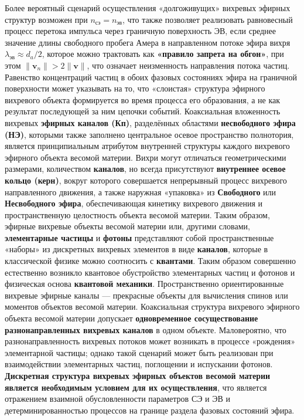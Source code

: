 Более вероятный сценарий осуществления «долгоживущих» вихревых эфирных структур возможен при \(n_{\text{сэ}} = n_{\text{эв}}\), что также позволяет реализовать равновесный процесс перетока импульса через граничную поверхность ЭВ, если среднее значение длины свободного пробега Амера в направленном потоке эфира вихря \(\lambda_{\text{эв}} \approx d_a/2\), которое можно трактовать как \textbf{«правило запрета на обгон»}, при этом \(\|\mathbf{v}_n\| > 2\|\mathbf{v}\|\), что означает неизменность направления потока частиц. Равенство концентраций частиц в обоих фазовых состояниях эфира на граничной поверхности может указывать на то, что «слоистая» структура эфирного вихревого объекта формируется во время процесса его образования, а не как результат последующей за ним цепочки событий. Коаксиальная вложенность вихревых \textbf{эфирных каналов (Кп)}, разделённых областями \textbf{несвободного эфира (НЭ)}, которыми также заполнено центральное осевое пространство полнотория, является принципиальным атрибутом внутренней структуры каждого вихревого эфирного объекта весомой материи. Вихри могут отличаться геометрическими размерами, количеством \textbf{каналов}, но всегда присутствуют \textbf{внутреннее осевое кольцо (керн)}, вокруг которого совершается непрерывный процесс вихревого направленного движения, а также наружная «упаковка» из \textbf{Свободного} или \textbf{Несвободного эфира}, обеспечивающая кинетику вихревого движения и пространственную целостность объекта весомой материи. Таким образом, эфирные вихревые объекты весомой материи или, другими словами, \textbf{элементарные частицы} и \textbf{фотоны} представляют собой пространственные «наборы» из дискретных вихревых элементов в виде \textbf{каналов}, которые в классической физике можно соотносить с \textbf{квантами}. Таким образом совершенно естественно возникло квантовое обустройство элементарных частиц и фотонов и физическая основа \textbf{квантовой механики}. Пространственно ориентированные вихревые эфирные каналы — прекрасные объекты для вычисления спинов или моментов объектов весомой материи. Коаксиальная структура вихревого эфирного объекта весомой материи допускает \textbf{одновременное сосуществование разнонаправленных вихревых каналов} в одном объекте. Маловероятно, что разнонаправленность вихревых потоков может возникать в процессе «рождения» элементарной частицы; однако такой сценарий может быть реализован при взаимодействии элементарных частиц, поглощении и испускании фотонов. \textbf{Дискретная структура вихревых эфирных объектов весомой материи является необходимым условием для их осуществления}, что является отражением взаимной обусловленности параметров СЭ и ЭВ и детерминированностью процессов на границе раздела фазовых состояний эфира.

